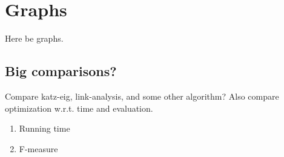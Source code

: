 \chapter{Graphs}\label{cha:graphs}

Here be graphs.


\newpage


\newpage


\newpage


\newpage

\section{Big comparisons?}

Compare katz-eig, link-analysis, and some other algorithm?
Also compare optimization w.r.t. time and evaluation.

\begin{enumerate}
    \item Running time
    \item F-measure
\end{enumerate}

